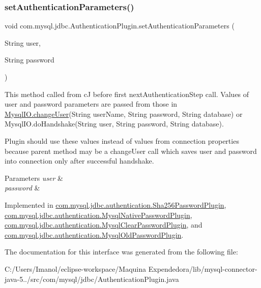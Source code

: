 \subsubsection{\texorpdfstring{set\+Authentication\+Parameters()}{setAuthenticationParameters()}}
{\footnotesize\ttfamily void com.\+mysql.\+jdbc.\+Authentication\+Plugin.\+set\+Authentication\+Parameters (\begin{DoxyParamCaption}\item[{String}]{user,  }\item[{String}]{password }\end{DoxyParamCaption})}

This method called from cJ before first next\+Authentication\+Step call. Values of user and password parameters are passed from those in \mbox{\hyperlink{classcom_1_1mysql_1_1jdbc_1_1_mysql_i_o_a2b65fc2cb7cccdb5923da263d37019ad}{Mysql\+I\+O.\+change\+User}}(String user\+Name, String password, String database) or Mysql\+I\+O.\+do\+Handshake(String user, String password, String database).

Plugin should use these values instead of values from connection properties because parent method may be a change\+User call which saves user and password into connection only after successful handshake.


\begin{DoxyParams}{Parameters}
{\em user} & \\
\hline
{\em password} & \\
\hline
\end{DoxyParams}


Implemented in \mbox{\hyperlink{classcom_1_1mysql_1_1jdbc_1_1authentication_1_1_sha256_password_plugin_a2aa9fda4aa70184de8f7407854ed0000}{com.\+mysql.\+jdbc.\+authentication.\+Sha256\+Password\+Plugin}}, \mbox{\hyperlink{classcom_1_1mysql_1_1jdbc_1_1authentication_1_1_mysql_native_password_plugin_a99b07a97f92e7f3cf6e71712eb975613}{com.\+mysql.\+jdbc.\+authentication.\+Mysql\+Native\+Password\+Plugin}}, \mbox{\hyperlink{classcom_1_1mysql_1_1jdbc_1_1authentication_1_1_mysql_clear_password_plugin_a1fc50442576ef3ff00a914440398f4b7}{com.\+mysql.\+jdbc.\+authentication.\+Mysql\+Clear\+Password\+Plugin}}, and \mbox{\hyperlink{classcom_1_1mysql_1_1jdbc_1_1authentication_1_1_mysql_old_password_plugin_a744eb8f01ec58474ea3a0d9ed5007531}{com.\+mysql.\+jdbc.\+authentication.\+Mysql\+Old\+Password\+Plugin}}.



The documentation for this interface was generated from the following file\+:\begin{DoxyCompactItemize}
\item 
C\+:/\+Users/\+Imanol/eclipse-\/workspace/\+Maquina Expendedora/lib/mysql-\/connector-\/java-\/5../src/com/mysql/jdbc/Authentication\+Plugin.\+java\end{DoxyCompactItemize}
